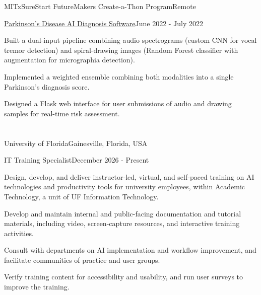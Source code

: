 \documentclass[10pt, letterpaper]{article}
\begin{document}
\begin{leadershipentry}{MITxSureStart FutureMakers Create-a-Thon Program}{Remote}
	\begin{positionentry}{\href{https://github.com/agopalareddy/AIPS}{Parkinson's Disease AI Diagnosis Software}}{June 2022 - July 2022}
		\item Built a dual-input pipeline combining audio spectrograms (custom CNN for vocal tremor detection) and spiral-drawing images (Random Forest classifier with augmentation for micrographia detection).
		\item Implemented a weighted ensemble combining both modalities into a single Parkinson's diagnosis score.
		\item Designed a Flask web interface for user submissions of audio and drawing samples for real-time risk assessment.
	\end{positionentry}
\end{leadershipentry}

\vspace{\headerSpacing}

\section{}

\begin{leadershipentry}{University of Florida}{Gainesville, Florida, USA}
	\begin{positionentry}{IT Training Specialist}{December 2026 - Present}
		\item Design, develop, and deliver instructor-led, virtual, and self-paced training on AI technologies and productivity tools for university employees, within Academic Technology, a unit of UF Information Technology.
		\item Develop and maintain internal and public-facing documentation and tutorial materials, including video, screen-capture resources, and interactive training activities.
		\item Consult with departments on AI implementation and workflow improvement, and facilitate communities of practice and user groups.
		\item Verify training content for accessibility and usability, and run user surveys to improve the training.
	\end{positionentry}
\end{leadershipentry}
\end{document}
